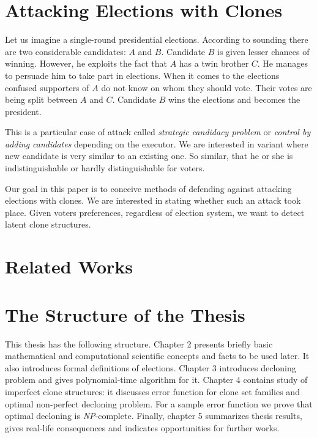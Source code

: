 

\section{Attacking Elections with Clones}


Let us imagine a single-round presidential elections.
According to sounding there are two considerable candidates: $A$ and $B$.
Candidate $B$ is given lesser chances of winning.
However, he exploits the fact that $A$ has a twin brother $C$.
He manages to persuade him to take part in elections.
When it comes to the elections confused supporters of $A$ do not know on whom they should vote.
Their votes are being split between $A$ and $C$.
Candidate $B$ wins the elections and becomes the president.

This is a particular case of attack called \textit{strategic candidacy problem} or \textit{control by adding candidates}
depending on the executor.
We are interested in variant where new candidate is very similar to an existing one.
So similar, that he or she is indistinguishable or hardly distinguishable for voters.

Our goal in this paper is to conceive methods of defending against attacking elections with clones.
We are interested in stating whether such an attack took place.
Given voters preferences, regardless of election system, we want to detect latent clone structures.

\section{Related Works}


\section{The Structure of the Thesis}


This thesis has the following structure.
Chapter 2 presents briefly basic mathematical and computational scientific concepts and facts to be used later.
It also introduces formal definitions of elections.
Chapter 3 introduces decloning problem and gives polynomial-time algorithm for it.
Chapter 4 contains study of imperfect clone structures:
it discusses error function for clone set families and optimal non-perfect decloning problem.
For a sample error function we prove that optimal decloning is \textit{NP}-complete.
Finally, chapter 5 summarizes thesis results, gives real-life consequences and indicates opportunities for further works.